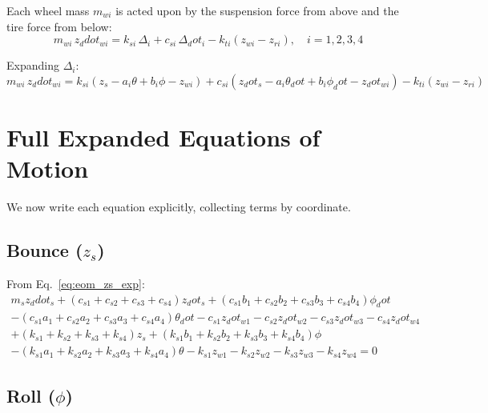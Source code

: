 \documentclass[11pt]{article}
\def\ddot#1{#1_ddot}%
\def\dot#1{#1_dot}%
\begin{document}
Each wheel mass $m_{wi}$ is acted upon by the suspension force from above and the tire force from below:
\begin{equation}
\boxed{m_{wi}\,\ddot{z}_{wi} = k_{si}\,\Delta_i + c_{si}\,\dot{\Delta}_i - k_{ti}(z_{wi} - z_{ri}), \quad i = 1,2,3,4}
\label{eq:eom_wi}
\end{equation}

Expanding $\Delta_i$:
\begin{equation}
m_{wi}\,\ddot{z}_{wi} = k_{si}(z_s - a_i\theta + b_i\phi - z_{wi}) + c_{si}(\dot{z}_s - a_i\dot\theta + b_i\dot\phi - \dot{z}_{wi}) - k_{ti}(z_{wi} - z_{ri})
\label{eq:eom_wi_exp}
\end{equation}

\section{Full Expanded Equations of Motion}

We now write each equation explicitly, collecting terms by coordinate.

\subsection{Bounce ($z_s$)}

From Eq.~\eqref{eq:eom_zs_exp}:
\begin{multline}
m_s\ddot{z}_s + (c_{s1}+c_{s2}+c_{s3}+c_{s4})\dot{z}_s + (c_{s1}b_1+c_{s2}b_2+c_{s3}b_3+c_{s4}b_4)\dot\phi \\
 - (c_{s1}a_1+c_{s2}a_2+c_{s3}a_3+c_{s4}a_4)\dot\theta - c_{s1}\dot{z}_{w1} - c_{s2}\dot{z}_{w2} - c_{s3}\dot{z}_{w3} - c_{s4}\dot{z}_{w4} \\
+ (k_{s1}+k_{s2}+k_{s3}+k_{s4})z_s + (k_{s1}b_1+k_{s2}b_2+k_{s3}b_3+k_{s4}b_4)\phi \\
 - (k_{s1}a_1+k_{s2}a_2+k_{s3}a_3+k_{s4}a_4)\theta - k_{s1}z_{w1} - k_{s2}z_{w2} - k_{s3}z_{w3} - k_{s4}z_{w4} = 0
\label{eq:bounce_full}
\end{multline}

\subsection{Roll ($\phi$)}
\end{document}
